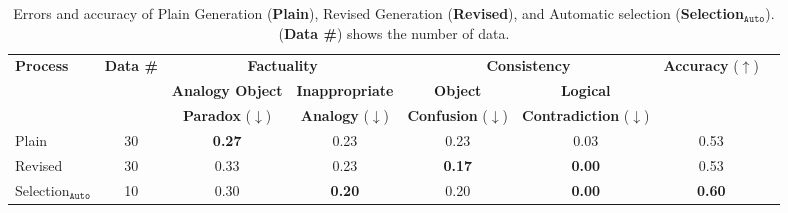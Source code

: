 

\begin{table*}[t]
\centering
\small
\caption{Errors and accuracy of Plain Generation (\textbf{Plain}), Revised Generation (\textbf{Revised}), and Automatic selection (\textbf{Selection$_\texttt{Auto}$}). (\textbf{Data \#}) shows the number of data. }
\label{tab:error_rates}
\begin{tabular}{lccccccc}
\toprule
\multirow{3}{*}{\textbf{Process}}  & \multirow{3}{*}{\textbf{Data \#}} & \multicolumn{2}{c}{\textbf{Factuality}}     & \multicolumn{2}{c}{\textbf{Consistency}}        & \multirow{3}{*}{\textbf{Accuracy} ($\uparrow$)} \\
\cmidrule(lr){3-4} 
\cmidrule(lr){5-6} 
                      &  & \textbf{Analogy Object}& \textbf{Inappropriate} & \textbf{Object} & \textbf{Logical} & \\ 
                      & & \textbf{Paradox}  ($\downarrow$)& \textbf{Analogy} ($\downarrow$)& \textbf{Confusion} ($\downarrow$)& \textbf{Contradiction} ($\downarrow$)& \\
\midrule
Plain         &     30  & \textbf{0.27}                & 0.23                  & 0.23                & 0.03                 & 0.53    \\
Revised      &      30     & 0.33           & 0.23                  & \textbf{0.17}                & \textbf{0.00}                 & 0.53    \\
Selection$_\texttt{Auto}$   &      10     & 0.30           & \textbf{0.20}                  & 0.20              & \textbf{0.00}                 & \textbf{0.60}    \\ 
\bottomrule
\end{tabular}
\end{table*}